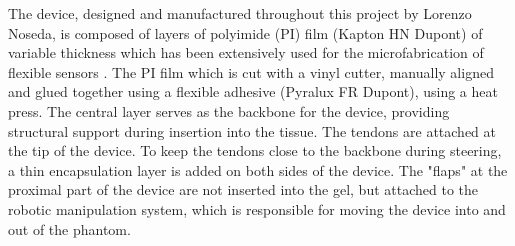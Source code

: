 The device, designed and manufactured throughout this project by Lorenzo Noseda, is composed of layers of polyimide (PI) film (Kapton HN Dupont) of variable thickness which has been extensively used for the microfabrication of flexible sensors \cite{noseda_flat_2024}. The PI film which is cut with a vinyl cutter, manually aligned and glued together using a flexible adhesive (Pyralux FR Dupont), using a heat press. 
\newline \newline 
The central layer serves as the backbone for the device, providing structural support during insertion into the tissue. The tendons are attached at the tip of the device. To keep the tendons close to the backbone during steering, a thin encapsulation layer is added on both sides of the device. 
\newline \newline
The "flaps" at the proximal part of the device are not inserted into the gel, but attached to the robotic manipulation system, which is responsible for moving the device into and out of the phantom.

